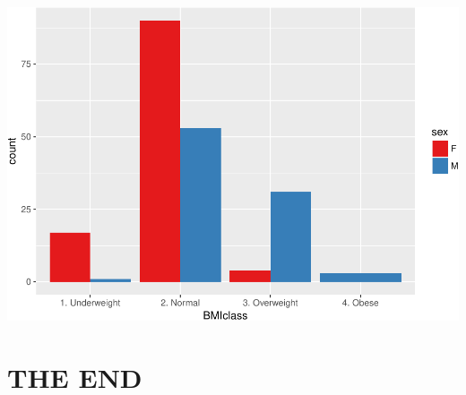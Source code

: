 \documentclass[]{elsarticle} %
\makeatletter
\def\maxwidth{\ifdim\Gin@nat@width>\linewidth\linewidth
\else\Gin@nat@width\fi}
\let\Oldincludegraphics\includegraphics
\renewcommand{\includegraphics}[1]{\Oldincludegraphics[width=\maxwidth]{#1}}
\makeatother
\begin{document}
\includegraphics{Flynn_HW_02_files/figure-latex/clustered bar chart-1.pdf}

\section{THE END}\label{the-end}
\end{document}
